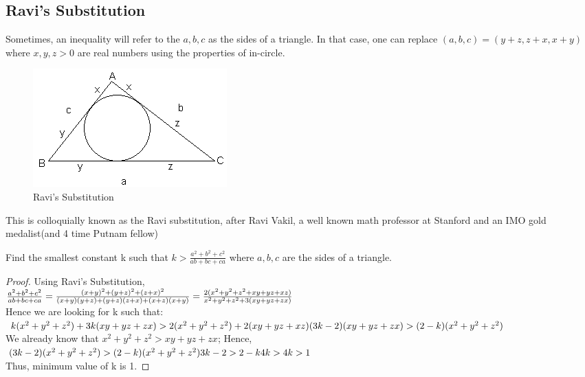 \subsection{Ravi's Substitution}
Sometimes, an inequality will refer to the $a, b, c$ as the sides of a triangle. In that case, one can replace $(a, b, c) = (y + z, z + x, x + y)$ where $x, y, z > 0$ are real numbers using the properties of in-circle. \\
\begin{figure} [h]
    \centering
    \includegraphics[width=0.5\linewidth]{Photos/Ravi's substitution.png}
    \caption{Ravi's Substitution}
    
\end{figure}
This is colloquially known as the Ravi substitution, after Ravi Vakil, a well known math professor at Stanford and an IMO gold medalist(and 4 time Putnam fellow)
\begin{example}
     Find the smallest constant k such that
$k>\frac{a^2+b^2+c^2}{ab+bc+ca}$
where $a,b,c$ are the sides of a triangle.
\end{example}
\begin{proof}
    Using Ravi's Substitution,\\
    $\frac{a^2+b^2+c^2}{ab+bc+ca}\\
    =\frac{(x+y)^2+(y+z)^2+(z+x)^2}{(x+y)(y+z)+(y+z)(z+x)+(x+z)(x+y)}\\
    =\frac{2(x^2+y^2+z^2+xy+yz+xz)}{x^2+y^2+z^2+3(xy+yz+zx)}$\\
    Hence we are looking for k such that:\\
    $k(x^2+y^2+z^2)+3k(xy+yz+zx)> 2(x^2+y^2+z^2)+2(xy+yz+xz)\\
    (3k-2)(xy+yz+zx)>(2-k)(x^2+y^2+z^2)$\\
    We already know that $x^2+y^2+z^2 > xy+yz+zx$; Hence,\\
    $(3k-2)(x^2+y^2+z^2)>(2-k)(x^2+y^2+z^2)\\
    3k-2 > 2-k\\
    4k > 4\\
    k > 1$\\
    Thus, minimum value of k is 1.
\end{proof}
